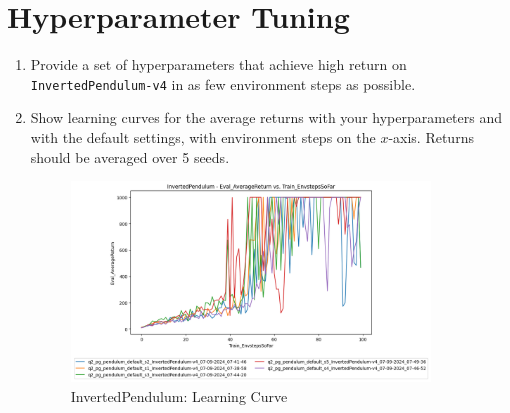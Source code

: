 \documentclass{article}
\begin{document}
\newpage\section{Hyperparameter Tuning}
\begin{enumerate}
    \item Provide a set of hyperparameters that achieve high return on \verb|InvertedPendulum-v4| in as few environment steps as possible.
    \item Show learning curves for the average returns with your hyperparameters and with the default settings, with environment steps on the $x$-axis. Returns should be averaged over 5 seeds.
     \begin{figure}[ht]
    	\centering
    	\includegraphics[width=0.9\textwidth]{./images/7-InvertedPendulum-LearningCurve.png}
    	\caption{InvertedPendulum: Learning Curve}
    	\label{fig:7-InvertedPendulum-LearningCurve}
    \end{figure}
\end{enumerate}
\end{document}
